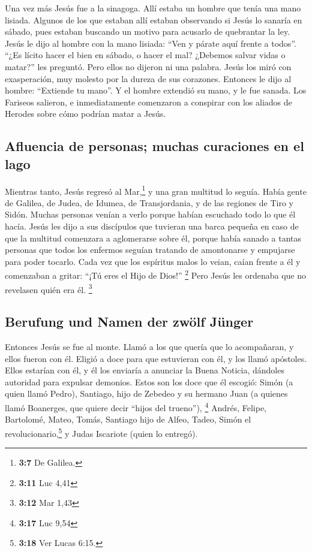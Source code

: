  Una vez más Jesús fue a la sinagoga. Allí estaba un
hombre que tenía una mano lisiada.  Algunos de los que
estaban allí estaban observando si Jesús lo sanaría en sábado, pues
estaban buscando un motivo para acusarlo de quebrantar la ley.
 Jesús le dijo al hombre con la mano lisiada: ``Ven y
párate aquí frente a todos''.  ``¿Es lícito hacer el bien
en sábado, o hacer el mal? ¿Debemos salvar vidas o matar?'' les
preguntó. Pero ellos no dijeron ni una palabra.  Jesús los
miró con exasperación, muy molesto por la dureza de sus corazones.
Entonces le dijo al hombre: ``Extiende tu mano''. Y el hombre extendió
su mano, y le fue sanada.  Los Fariseos salieron, e
inmediatamente comenzaron a conspirar con los aliados de Herodes sobre
cómo podrían matar a Jesús.

\hypertarget{afluencia-de-personas-muchas-curaciones-en-el-lago}{%
\subsection{Afluencia de personas; muchas curaciones en el
lago}\label{afluencia-de-personas-muchas-curaciones-en-el-lago}}

 Mientras tanto, Jesús regresó al Mar,\footnote{\textbf{3:7}
  De Galilea.} y una gran multitud lo seguía. Había gente de Galilea,
 de Judea, de Idumea, de Transjordania, y de las regiones
de Tiro y Sidón. Muchas personas venían a verlo porque habían escuchado
todo lo que él hacía.  Jesús les dijo a sus discípulos que
tuvieran una barca pequeña en caso de que la multitud comenzara a
aglomerarse sobre él,  porque había sanado a tantas
personas que todos los enfermos seguían tratando de amontonarse y
empujarse para poder tocarlo.  Cada vez que los espíritus
malos lo veian, caían frente a él y comenzaban a gritar: ``¡Tú eres el
Hijo de Dios!'' \footnote{\textbf{3:11} Luc 4,41}  Pero
Jesús les ordenaba que no revelasen quién era él. \footnote{\textbf{3:12}
  Mar 1,43}

\hypertarget{berufung-und-namen-der-zwuxf6lf-juxfcnger}{%
\subsection{Berufung und Namen der zwölf
Jünger}\label{berufung-und-namen-der-zwuxf6lf-juxfcnger}}

 Entonces Jesús se fue al monte. Llamó a los que quería
que lo acompañaran, y ellos fueron con él.  Eligió a doce
para que estuvieran con él, y los llamó apóstoles. Ellos estarían con
él, y él los enviaría a anunciar la Buena Noticia, 
dándoles autoridad para expulsar demonios.  Estos son los
doce que él escogió: Simón (a quien llamó Pedro), 
Santiago, hijo de Zebedeo y su hermano Juan (a quienes llamó Boanerges,
que quiere decir ``hijos del trueno''), \footnote{\textbf{3:17} Luc 9,54}
 Andrés, Felipe, Bartolomé, Mateo, Tomás, Santiago hijo
de Alfeo, Tadeo, Simón el revolucionario,\footnote{\textbf{3:18} Ver
  Lucas 6:15.}  y Judas Iscariote (quien lo entregó).

